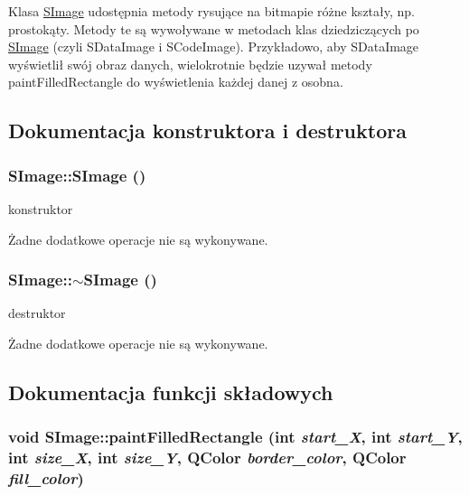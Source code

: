 Klasa \hyperlink{classSImage}{SImage} udostępnia metody rysujące na bitmapie różne kształy, np. prostokąty. Metody te są wywoływane w metodach klas dziedziczących po \hyperlink{classSImage}{SImage} (czyli SDataImage i SCodeImage). Przykładowo, aby SDataImage wyświetlił swój obraz danych, wielokrotnie będzie uzywał metody paintFilledRectangle do wyświetlenia każdej danej z osobna. 

\subsection{Dokumentacja konstruktora i destruktora}
\hypertarget{classSImage_76e408c8c9d80017ab4bcdcb4788de15}{
\subsubsection[{SImage}]{\setlength{\rightskip}{0pt plus 5cm}SImage::SImage ()}}
\label{classSImage_76e408c8c9d80017ab4bcdcb4788de15}


konstruktor 

Żadne dodatkowe operacje nie są wykonywane. \hypertarget{classSImage_615b1cbc644a5d8b88fd6ec1efa8c732}{
\subsubsection[{$\sim$SImage}]{\setlength{\rightskip}{0pt plus 5cm}SImage::$\sim$SImage ()}}
\label{classSImage_615b1cbc644a5d8b88fd6ec1efa8c732}


destruktor 

Żadne dodatkowe operacje nie są wykonywane. 

\subsection{Dokumentacja funkcji składowych}
\hypertarget{classSImage_dc89f8b2607722f6fbf52f481103bf71}{
\subsubsection[{paintFilledRectangle}]{\setlength{\rightskip}{0pt plus 5cm}void SImage::paintFilledRectangle (int {\em start\_\-X}, \/  int {\em start\_\-Y}, \/  int {\em size\_\-X}, \/  int {\em size\_\-Y}, \/  QColor {\em border\_\-color}, \/  QColor {\em fill\_\-color})}}
\label{classSImage_dc89f8b2607722f6fbf52f481103bf71}


